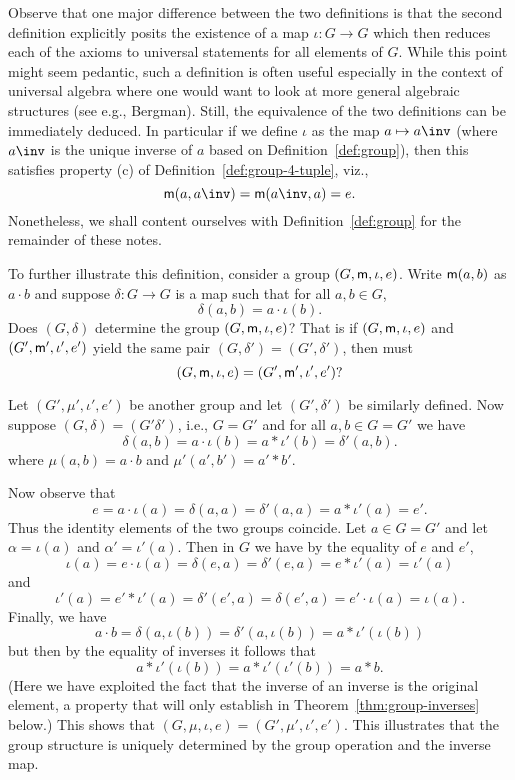Observe that one major difference between the two definitions is that the second
definition explicitly posits the existence of a map \(\iota: G \to G\) which
then reduces each of the axioms to universal statements for all elements of
\(G\). While this point might seem pedantic, such a definition is often useful
especially in the context of universal algebra where one would want to look at
more general algebraic structures (see e.g., Bergman). Still, the equivalence of
the two definitions can be immediately deduced. In particular if we define
\(\iota\) as the map \(a \mapsto a\inv\) (where \(a\inv\) is the unique inverse
of \(a\) based on Definition~\ref{def:group}), then this satisfies property (c)
of Definition~\ref{def:group-4-tuple}, viz.,
\[
    \mult(a, a\inv) = \mult(a\inv, a) = e.
\]
Nonetheless, we shall content ourselves with Definition~\ref{def:group} for the remainder of these notes.

To further illustrate this definition, consider a group \((G, {\mathsf{m}}, \iota,
e)\). Write \({\mathsf{m}}(a,b)\) as \(a\cdot b\) and suppose \(\delta : G \to G\) is a
map such that for all \(a, b \in G\),
\[
    \delta(a, b) = a\cdot\iota(b).
\]
Does \((G, \delta)\) determine the group \((G, {\mathsf{m}}, \iota, e)\)? That is if
\((G, {\mathsf{m}}, \iota, e)\) and \((G', {\mathsf{m}}', \iota', e')\) yield the same pair
\((G, \delta') = (G', \delta')\), then must
\[(G, {\mathsf{m}}, \iota, e) = (G', {\mathsf{m}}', \iota', e')?\]

Let \((G', \mu', \iota', e')\) be another group and let \((G', \delta')\) be
similarly defined. Now suppose \((G, \delta) = (G' \delta')\), i.e., \(G = G'\)
and for all \(a, b \in G = G'\) we have
\[
\delta(a, b) = a \cdot \iota(b) = a * \iota'(b) = \delta'(a, b).
\]
where \(\mu(a, b) = a \cdot b\) and \(\mu'(a', b') = a' * b'\).

Now observe that
\[
e = a \cdot \iota(a) = \delta(a, a) = \delta'(a, a) = a * \iota'(a) = e'.
\]
Thus the identity elements of the two groups coincide. Let \(a \in G = G'\) and
let \(\alpha = \iota(a)\) and \(\alpha' = \iota'(a)\). Then in \(G\) we have by
the equality of \(e\) and \(e'\),
\[
\iota(a) = e \cdot \iota(a) = \delta(e, a) = \delta'(e, a) = e * \iota'(a) = \iota'(a)
\]
and
\[
 \iota'(a) = e' * \iota'(a) = \delta'(e', a) = \delta(e',a) = e' \cdot \iota(a) = \iota(a).
\]
Finally, we have
\[
a \cdot b = \delta(a, \iota(b)) = \delta'(a, \iota(b)) = a * \iota'(\iota(b))
\]
but then by the equality of inverses it follows that
\[
 a * \iota'(\iota(b)) = a * \iota'(\iota'(b)) = a * b.
\]
(Here we have exploited the fact that the inverse of an inverse is the original
element, a property that will only establish in Theorem~\ref{thm:group-inverses}
below.) This shows that \((G, \mu, \iota, e) = (G', \mu', \iota', e')\). This
illustrates that the group structure is uniquely determined by the group
operation and the inverse map.





